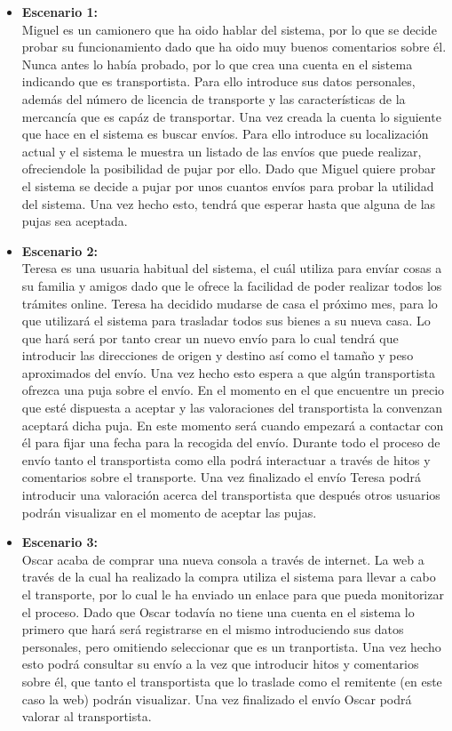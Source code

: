 \documentclass[10pt, a4paper,spanish]{article}
\begin{document}
		\begin{itemize}
			\item \textbf{Escenario 1:} \\
				Miguel es un camionero que ha oido hablar del sistema, por lo que se decide probar su funcionamiento dado que ha oido muy buenos comentarios sobre él. Nunca antes lo había probado, por lo que crea una cuenta en el sistema indicando que es transportista. Para ello introduce sus datos personales, además del número de licencia de transporte y las características de la mercancía que es capáz de transportar. Una vez creada la cuenta lo siguiente que hace en el sistema es buscar envíos. Para ello introduce su localización actual y el sistema le muestra un listado de las envíos que puede realizar, ofreciendole la posibilidad de pujar por ello. Dado que Miguel quiere probar el sistema se decide a pujar por unos cuantos envíos para probar la utilidad del sistema. Una vez hecho esto, tendrá que esperar hasta que alguna de las pujas sea aceptada.

			\item \textbf{Escenario 2:} \\
				Teresa es una usuaria habitual del sistema, el cuál utiliza para envíar cosas a su familia y amigos dado que le ofrece la facilidad de poder realizar todos los trámites online. Teresa ha decidido mudarse de casa el próximo mes, para lo que utilizará el sistema para trasladar todos sus bienes a su nueva casa. Lo que hará será por tanto crear un nuevo envío para lo cual tendrá que introducir las direcciones de origen y destino así como el tamaño y peso aproximados del envío. Una vez hecho esto espera a que algún transportista ofrezca una puja sobre el envío. En el momento en el que encuentre un precio que esté dispuesta a aceptar y las valoraciones del transportista la convenzan aceptará dicha puja. En este momento será cuando empezará a contactar con él para fijar una fecha para la recogida del envío. Durante todo el proceso de envío tanto el transportista como ella podrá interactuar a través de hitos y comentarios sobre el transporte. Una vez finalizado el envío Teresa podrá introducir una valoración acerca del transportista que después otros usuarios podrán visualizar en el momento de aceptar las pujas.

			\item \textbf{Escenario 3:} \\
				Oscar acaba de comprar una nueva consola a través de internet. La web a través de la cual ha realizado la compra utiliza el sistema para llevar a cabo el transporte, por lo cual le ha enviado un enlace para que pueda monitorizar el proceso. Dado que Oscar todavía no tiene una cuenta en el sistema lo primero que hará será registrarse en el mismo introduciendo sus datos personales, pero omitiendo seleccionar que es un tranportista. Una vez hecho esto podrá consultar su envío a la vez que introducir hitos y comentarios sobre él, que tanto el transportista que lo traslade como el remitente (en este caso la web) podrán visualizar. Una vez finalizado el envío Oscar podrá valorar al transportista.

		\end{itemize}
\end{document}
